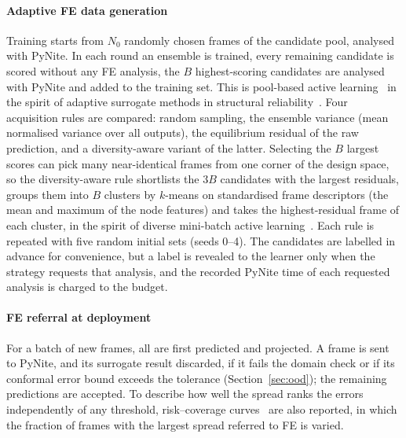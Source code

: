 \paragraph{Adaptive FE data generation} Training starts from $N_0$ randomly chosen frames of the candidate pool, analysed with PyNite. In each round an ensemble is trained, every remaining candidate is scored without any FE analysis, the $B$ highest-scoring candidates are analysed with PyNite and added to the training set. This is pool-based active learning~\cite{settles2009active} in the spirit of adaptive surrogate methods in structural reliability~\cite{bichon2008egra,echard2011akmcs}. Four acquisition rules are compared: random sampling, the ensemble variance (mean normalised variance over all outputs), the equilibrium residual of the raw prediction, and a diversity-aware variant of the latter. Selecting the $B$ largest scores can pick many near-identical frames from one corner of the design space, so the diversity-aware rule shortlists the $3B$ candidates with the largest residuals, groups them into $B$ clusters by $k$-means on standardised frame descriptors (the mean and maximum of the node features) and takes the highest-residual frame of each cluster, in the spirit of diverse mini-batch active learning~\cite{zhdanov2019diverse,sener2018coreset}. Each rule is repeated with five random initial sets (seeds 0--4). The candidates are labelled in advance for convenience, but a label is revealed to the learner only when the strategy requests that analysis, and the recorded PyNite time of each requested analysis is charged to the budget.

\paragraph{FE referral at deployment} For a batch of new frames, all are first predicted and projected. A frame is sent to PyNite, and its surrogate result discarded, if it fails the domain check or if its conformal error bound exceeds the tolerance (Section~\ref{sec:ood}); the remaining predictions are accepted. To describe how well the spread ranks the errors independently of any threshold, risk--coverage curves~\cite{geifman2017selective} are also reported, in which the fraction of frames with the largest spread referred to FE is varied.

